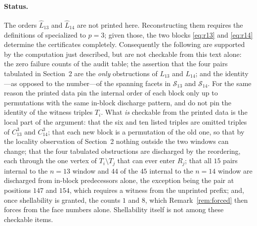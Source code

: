 \documentclass[11pt]{amsart}
\theoremstyle{remark}
\begin{document}
\paragraph{Status.}
The orders $\widehat L_{13}$ and $\widehat L_{14}$ are not printed here.
Reconstructing them requires the definitions of \cite[Section~3]{CS}
specialized to $p=3$; given those, the two blocks \eqref{eq:r13} and
\eqref{eq:r14} determine the certificates completely.  Consequently the
following are supported by the computation just described, but are not
checkable from this text alone: the zero failure counts of the audit table;
the assertion that the four pairs tabulated in Section~2 are the
\emph{only} obstructions of $L_{13}$ and $L_{14}$; and the identity---as
opposed to the number---of the spanning facets in $\mathcal S_{13}$ and
$\mathcal S_{14}$.  For the same reason the printed data pin the internal
order of each block only up to permutations with the same in-block discharge
pattern, and do not pin the identity of the witness triples $T_i$.  What
\emph{is} checkable from the printed data is the local part of the argument:
that the six and ten listed triples are omitted triples of $C_{13}^3$ and
$C_{14}^3$; that each new block is a permutation of the old one, so that
by the locality observation of Section~2 nothing outside the two windows can
change; that the four tabulated obstructions are discharged by the
reordering, each through the one vertex of $T_i\setminus T_j$ that can ever
enter $R_j$; that all $15$ pairs internal to the $n=13$ window and $44$ of
the $45$ internal to the $n=14$ window are discharged from in-block
predecessors alone, the exception being the pair at positions $147$ and
$154$, which requires a witness from the unprinted prefix; and, once
shellability is granted, the counts $1$ and $8$, which
Remark~\ref{rem:forced} then forces from the face numbers alone.
Shellability itself is not among these checkable items.
\end{document}
